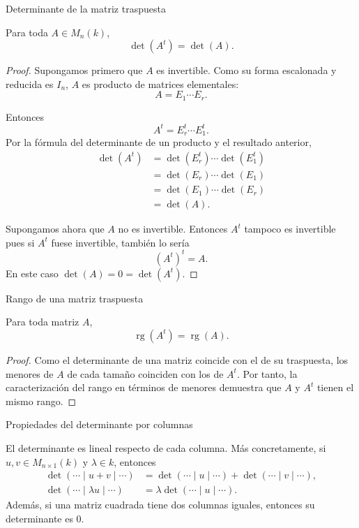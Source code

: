 \begin{frame}[allowframebreaks]{Determinante de la matriz traspuesta}

\begin{theorem}
Para toda \(A\in M_n(k)\),
\[
\det(A^t)=\det(A).
\]
\end{theorem}

\begin{proof}
Supongamos primero que \(A\) es invertible. Como su forma escalonada
y reducida es \(I_n\), \(A\) es producto de matrices elementales:
\[
A=E_1\cdots E_r.
\]

Entonces
\[
A^t=E_r^t\cdots E_1^t.
\]
Por la fórmula del determinante de un producto y el resultado
anterior,
\[
\begin{aligned}
\det(A^t)
&=\det(E_r^t)\cdots\det(E_1^t)\\
&=\det(E_r)\cdots\det(E_1)\\
&=\det(E_1)\cdots\det(E_r)\\
&=\det(A).
\end{aligned}
\]

Supongamos ahora que \(A\) no es invertible. Entonces \(A^t\)
tampoco es invertible pues si \(A^t\) fuese invertible,
también lo sería
\[
(A^t)^t=A.
\]
En este caso \(\det(A)=0=\det(A^t)\).
\end{proof}

\end{frame}

\begin{frame}{Rango de una matriz traspuesta}

\begin{corollary}
Para toda matriz \(A\),
\[
\operatorname{rg}(A^t)=\operatorname{rg}(A).
\]
\end{corollary}

\begin{proof}
Como el determinante de una matriz coincide con el de su traspuesta, los menores de \(A\) de cada tamaño coinciden con los de \(A^t\). Por tanto, la caracterización del rango en términos de menores demuestra que \(A\) y \(A^t\) tienen el mismo rango.
\end{proof}

\end{frame}


\begin{frame}{Propiedades del determinante por columnas}

\begin{corollary}
El determinante es lineal respecto de cada columna. Más concretamente, si $u,v\in M_{n\times 1}(k)$ y $\lambda\in k$, entonces
\begin{align*}
	\det\left(\cdots\mid u+v\mid\cdots\right)
	&=
	\det\left(\cdots\mid u\mid\cdots\right)
	+ \det\left(\cdots\mid v\mid\cdots\right),\\
	\det\left(\cdots\mid \lambda u\mid\cdots\right)
	&=
	\lambda\det\left(\cdots\mid u\mid\cdots\right).
\end{align*}
Además, si una matriz cuadrada tiene dos columnas iguales, entonces
su determinante es \(0\).
\end{corollary}

\end{frame}



